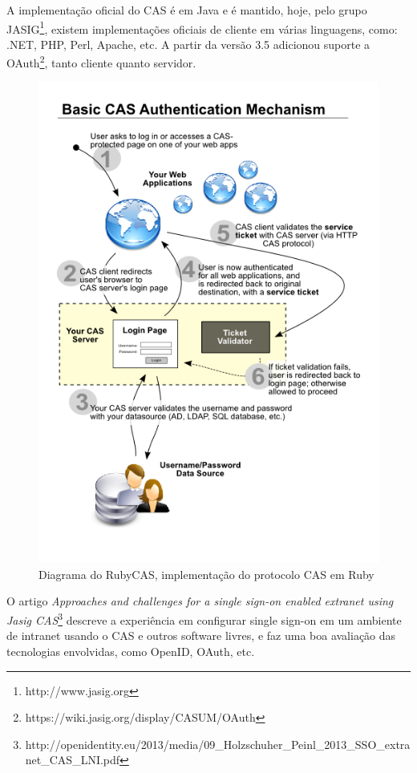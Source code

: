 \documentclass[11pt]{article}
\begin{document}
A implementação oficial do CAS é em Java e é mantido, hoje, pelo grupo
JASIG\footnote{http://www.jasig.org}, existem implementações oficiais de
cliente em várias linguagens, como: .NET, PHP, Perl, Apache, etc.
A partir da versão 3.5 adicionou suporte a
OAuth\footnote{https://wiki.jasig.org/display/CASUM/OAuth}, tanto cliente
quanto servidor.

\begin{figure}[h]
\center
\includegraphics[scale=0.4]{sso-rubycas.png}
\caption{Diagrama do RubyCAS, implementação do protocolo CAS em Ruby}
\label{fig:sso-rubycas}
\end{figure}

O artigo {\it Approaches and challenges for a single sign-on enabled extranet
using Jasig
CAS}\footnote{http://openidentity.eu/2013/media/09\_Holzschuher\_Peinl\_2013\_SSO\_extranet\_CAS\_LNI.pdf}
descreve a experiência em configurar single sign-on em um ambiente de intranet
usando o CAS e outros software livres, e faz uma boa avaliação das tecnologias
envolvidas, como OpenID, OAuth, etc.
\end{document}
